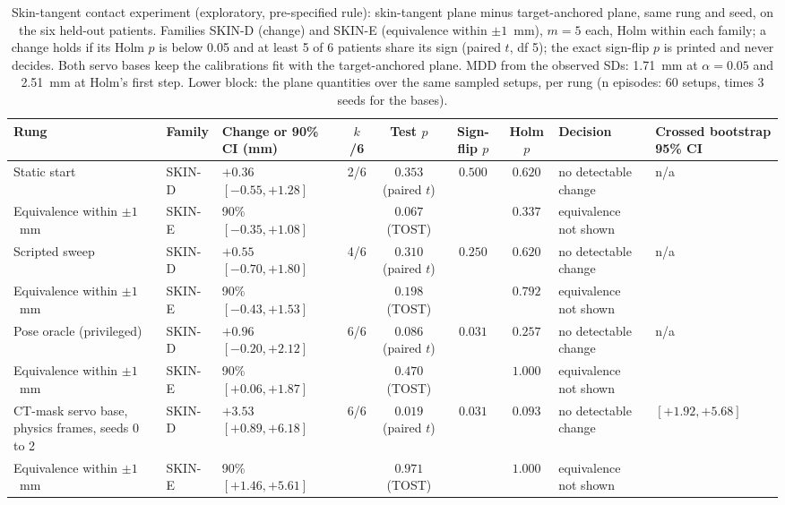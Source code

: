 
\begin{table}[tp]
\renewcommand{\baselinestretch}{1}\scriptsize
\caption{Skin-tangent contact experiment (exploratory, pre-specified rule): skin-tangent plane minus target-anchored plane, same rung and seed, on the six held-out patients. Families SKIN-D (change) and SKIN-E (equivalence within $\pm 1$~mm), $m = 5$ each, Holm within each family; a change holds if its Holm $p$ is below 0.05 and at least 5 of 6 patients share its sign (paired $t$, df 5); the exact sign-flip $p$ is printed and never decides. Both servo bases keep the calibrations fit with the target-anchored plane. MDD from the observed SDs: 1.71~mm at $\alpha = 0.05$ and 2.51~mm at Holm's first step. Lower block: the plane quantities over the same sampled setups, per rung (n episodes: 60 setups, times 3 seeds for the bases).}
\label{tab:arm-b}
\centering
\setlength{\tabcolsep}{3pt}
\begin{tabularx}{\textwidth}{@{}>{\raggedright\arraybackslash}X l l c c c c >{\raggedright\arraybackslash}p{} l@{}}
\toprule
Rung & Family & Change or 90\% CI (mm) & $k$/6 & Test $p$ & Sign-flip $p$ & Holm $p$ & Decision & Crossed bootstrap 95\% CI \\
\midrule
\quad Static start & SKIN-D & $+0.36$ $[-0.55, +1.28]$ & 2/6 & $0.353$ (paired $t$) & $0.500$ & $0.620$ & no detectable change & n/a \\
\quad\quad Equivalence within $\pm 1$~mm & SKIN-E & 90\% $[-0.35, +1.08]$ & & $0.067$ (TOST) & & $0.337$ & equivalence not shown & \\
\quad Scripted sweep & SKIN-D & $+0.55$ $[-0.70, +1.80]$ & 4/6 & $0.310$ (paired $t$) & $0.250$ & $0.620$ & no detectable change & n/a \\
\quad\quad Equivalence within $\pm 1$~mm & SKIN-E & 90\% $[-0.43, +1.53]$ & & $0.198$ (TOST) & & $0.792$ & equivalence not shown & \\
\quad Pose oracle (privileged) & SKIN-D & $+0.96$ $[-0.20, +2.12]$ & 6/6 & $0.086$ (paired $t$) & $0.031$ & $0.257$ & no detectable change & n/a \\
\quad\quad Equivalence within $\pm 1$~mm & SKIN-E & 90\% $[+0.06, +1.87]$ & & $0.470$ (TOST) & & $1.000$ & equivalence not shown & \\
\quad CT-mask servo base, physics frames, seeds 0 to 2 & SKIN-D & $+3.53$ $[+0.89, +6.18]$ & 6/6 & $0.019$ (paired $t$) & $0.031$ & $0.093$ & no detectable change & $[+1.92, +5.68]$ \\
\quad\quad Equivalence within $\pm 1$~mm & SKIN-E & 90\% $[+1.46, +5.61]$ & & $0.971$ (TOST) & & $1.000$ & equivalence not shown & \\

\end{tabularx}
\end{table}
